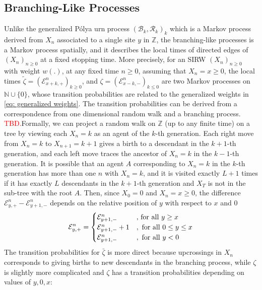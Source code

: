 \documentclass[twoside,12pt,a4paper]{article}
\numberwithin{equation}{section}
\newcommand\TBD{\textcolor{red}{TBD.}}
\begin{document}
		\subsection{Branching-Like Processes}
		Unlike the generalized P\'{o}lya urn process $(\mathcal{B}_k,\mathcal{R}_k )_k$ which is a Markov process derived from $X_n$ associated to a single site $y$ in $\mathbb{Z}$, the branching-like processes is a Markov process spatially, and it describes the local times of directed edges of $(X_n)_{n\geq 0}$ at a fixed stopping time. More precisely, for an SIRW $(X_n)_{n\geq 0}$ with weight $w(.)$, at any fixed time $n \geq 0$, assuming that $X_n = x \geq 0 $, the local times $\tilde{\zeta}= \left(\mathcal{E}^{n}_{x+k,+} \right)_{k\geq 0}$, and ${\zeta}= \left(\mathcal{E}^{n}_{x-k,-} \right)_{k\leq 0}$ are two Markov processes on $\mathbb{N}\cup\{0\}$, whose transition probabilities are related to the generalized weights in \eqref{eq: generalized weights}. The transition probabilities can be derived from a correspondence from one dimensional random walk and a branching process. \TBD Formally, we can project a random walk on $\mathbb{Z}$ (up to any finite time) on a tree by viewing each $X_n= k$ as an agent of the $k$-th generation. Each right move from $X_n=k$ to $X_{n+1}=k+1$ gives a birth to a descendant in the $k+1$-th generation, and each left move traces the ancestor of $X_n=k$ in the $k-1$-th generation. It is possible that an agent $A$ corresponding to $X_n=k$ in the $k$-th generation has more than one $n$ with $X_n=k$, and it is visited exactly $L+1$ times if it has exactly $L$ descendants in the $k+1$-th generation and $X_T $ is not in the sub-tree with the root $A$. 
		Then, since $X_0=0$ and $X_n =x \geq 0$, the difference $\mathcal{E}^n_{y,+} -\mathcal{E}^n_{y+1,-} $ depends on the relative position of $y$ with respect to $x$ and $0$ 
		\begin{equation}\label{eq: edge values}
			\mathcal{E}^n_{y,+} =\begin{cases}
				\mathcal{E}^n_{y+1,-} &\mbox{, for all $y\geq x$}\\
				\mathcal{E}^n_{y+1,-} +1 &,\mbox{ for all $0 \leq y\leq x$}
				\\
				\mathcal{E}^n_{y+1,-} &,\mbox{ for all $ y< 0 $}
			\end{cases}
		\end{equation}
		The transition probabilities for $\bar{\zeta}$ is more direct because upcrossings in $X_n$ corresponds to giving births to new descendants in the branching process, while $\zeta$ is slightly more complicated and $\zeta$ has a transition probabilities depending on values of $y,0,x$: 
\end{document}
